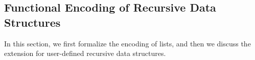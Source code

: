 \subsection{Functional Encoding of Recursive Data Structures}
\label{sec:recdata}

In this section, we first formalize the encoding of lists, and then we discuss the
extension for user-defined recursive data structures.

%
%
%

%
%
%

